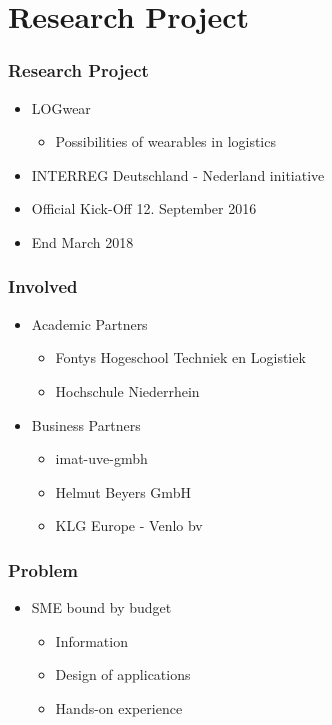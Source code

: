 \section{Research Project}
\begin{frame}\frametitle{Research Project}
	\begin{itemize}
		\item LOGwear
		\begin{itemize}
			\item Possibilities of wearables in logistics
		\end{itemize}
		\item INTERREG Deutschland - Nederland initiative
		\item Official Kick-Off 12. September 2016
		\item End March 2018
	\end{itemize}
\end{frame}

\begin{frame}\frametitle{Involved}
\begin{itemize}
	\item Academic Partners
	\begin{itemize}
		\item Fontys Hogeschool Techniek en Logistiek
		\item Hochschule Niederrhein
	\end{itemize}
	\item Business Partners
	\begin{itemize}
		\item imat-uve-gmbh
		\item Helmut Beyers GmbH
		\item KLG Europe - Venlo bv %
	\end{itemize}
	\end{itemize}
\end{frame}

\begin{frame}\frametitle{Problem}
\begin{itemize}
	\item SME bound by budget
	\begin{itemize}
		\item Information
		\item Design of applications
		\item Hands-on experience
	\end{itemize}
\end{itemize} 
\end{frame}

